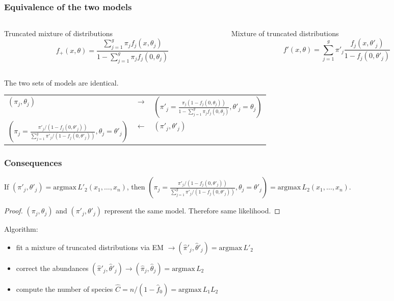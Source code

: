 \documentclass{beamer}
\begin{document}
\subsection*{}

\begin{frame}[shrink=3]\frametitle{Equivalence of the two models}
\begin{columns}[t]
 \begin{column}{0.5\textwidth} \centering
  Truncated mixture of distributions
  \[ f_+(x,\theta) = \frac{\sum_{j=1}^g \pi_j f_j(x,\theta_j)}{1-\sum_{j=1}^g \pi_j f_j(0,\theta_j)} \]
 \end{column}
 \begin{column}{0.5\textwidth} \centering
  Mixture of truncated distributions
\[ f'(x,\theta) = \sum_{j=1}^g \pi'_j \frac{ f_j(x,\theta'_j)}{1- f_j(0,\theta'_j)} \]
 \end{column}
\end{columns}
\begin{theorem}[Bohning2006]
 The two sets of models are identical.
\end{theorem}
\begin{tabularx}{\textwidth}{Xp{0.65cm}X}
\centering $(\pi_j,\theta_j)$ & $\longrightarrow$ &
 $(\pi'_j = \frac{\pi_j (1-f_j(0,\theta_j))}{1-\sum_{j=1}^g \pi_j f_j(0,\theta_j)}, \theta'_j = \theta_j)$ \\
 \centering $(\pi_j = \frac{\pi'_j /(1-f_j(0,\theta'_j))}{\sum_{j=1}^g \pi'_j / (1-f_j(0,\theta'_j))}, \theta_j = \theta'_j)$ & $\longleftarrow$ & \centering $(\pi'_j,\theta'_j)$ 
\end{tabularx} 
 
\end{frame}

\begin{frame}\frametitle{Consequences}
\begin{theorem}
 If $(\pi'_j,\theta'_j) = \text{argmax} \, L'_2(x_1,\ldots,x_n)$, then
$(\pi_j =  \frac{\pi'_j /(1-f_j(0,\theta'_j))}{\sum_{j=1}^g \pi'_j / (1-f_j(0,\theta'_j))}, \theta_j = \theta'_j) = \text{argmax} \, L_2(x_1,\ldots,x_n)$.
\end{theorem}
\begin{proof}
 $(\pi_j,\theta_j)$ and $(\pi'_j,\theta'_j)$ represent the same model. Therefore same likelihood.
\end{proof}
Algorithm:
\begin{itemize}
 \item fit a mixture of truncated distributions via EM $\longrightarrow (\hat \pi'_j,\hat \theta'_j) = \text{argmax} \, L'_2$
 \item correct the abundances $(\hat \pi'_j, \hat \theta'_j) \longrightarrow (\hat \pi_j,\hat \theta_j) = \text{argmax} \, L_2$
 \item compute the number of species $\hat C = n / (1 - \hat f_0) = \text{argmax} \, L_1 L_2$
\end{itemize}
\end{frame}
\end{document}
